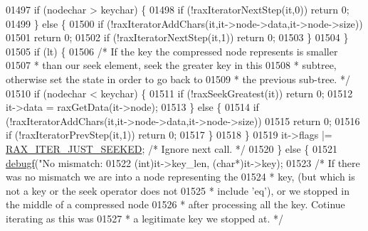 \begin{DoxyCode}
{{{{{{{{{{{{{{{{{{{{{{{01497                 \textcolor{keywordflow}{if} (nodechar > keychar) \{
01498                     \textcolor{keywordflow}{if} (!raxIteratorNextStep(it,0)) \textcolor{keywordflow}{return} 0;
01499                 \} \textcolor{keywordflow}{else} \{
01500                     \textcolor{keywordflow}{if} (!raxIteratorAddChars(it,it->node->data,it->node->size))
01501                         \textcolor{keywordflow}{return} 0;
01502                     \textcolor{keywordflow}{if} (!raxIteratorNextStep(it,1)) \textcolor{keywordflow}{return} 0;
01503                 \}
01504             \}
01505             \textcolor{keywordflow}{if} (lt) \{
01506                 \textcolor{comment}{/* If the key the compressed node represents is smaller}
01507 \textcolor{comment}{                 * than our seek element, seek the greater key in this}
01508 \textcolor{comment}{                 * subtree, otherwise set the state in order to go back to}
01509 \textcolor{comment}{                 * the previous sub-tree. */}
01510                 \textcolor{keywordflow}{if} (nodechar < keychar) \{
01511                     \textcolor{keywordflow}{if} (!raxSeekGreatest(it)) \textcolor{keywordflow}{return} 0;
01512                     it->data = raxGetData(it->node);
01513                 \} \textcolor{keywordflow}{else} \{
01514                     \textcolor{keywordflow}{if} (!raxIteratorAddChars(it,it->node->data,it->node->size))
01515                         \textcolor{keywordflow}{return} 0;
01516                     \textcolor{keywordflow}{if} (!raxIteratorPrevStep(it,1)) \textcolor{keywordflow}{return} 0;
01517                 \}
01518             \}
01519             it->flags |= \hyperlink{rax_8h_a665a029bbb4c6864ca2153b3ba3b746c}{RAX\_ITER\_JUST\_SEEKED}; \textcolor{comment}{/* Ignore next call. */}
01520         \} \textcolor{keywordflow}{else} \{
01521             \hyperlink{rax_8c_a10b215c81aa397dbc44adfb3e436befb}{debugf}(\textcolor{stringliteral}{"No mismatch: %
01522                 (\textcolor{keywordtype}{int})it->key\_len, (\textcolor{keywordtype}{char}*)it->key);
01523             \textcolor{comment}{/* If there was no mismatch we are into a node representing the}
01524 \textcolor{comment}{             * key, (but which is not a key or the seek operator does not}
01525 \textcolor{comment}{             * include 'eq'), or we stopped in the middle of a compressed node}
01526 \textcolor{comment}{             * after processing all the key. Cotinue iterating as this was}
01527 \textcolor{comment}{             * a legitimate key we stopped at. */}
}}}}}}}}}}}}}}}}}}}}}}}}
\end{DoxyCode}
